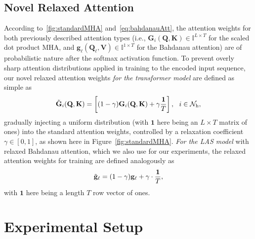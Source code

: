 \documentclass{article}
\newcommand{\VEC}[1]{\mathbf{#1}}          \newcommand{\VECG}[1]{\boldmath{#1}}     \newcommand{\MAT}[1]{\mathbf{#1}}          \newcommand{\MATG}[1]{\boldsymbol{#1}}
\begin{document}
\subsection{Novel Relaxed Attention}\vspace{-2mm}
According to~\eqref{fig:standardMHA} and~\eqref{eq:bahdanauAtt}, the attention weights for both previously described attention types (i.e., $\MAT{G}_i(\MAT{Q},\MAT{K})\!\in\!\mathbb{I}^{L\times T}$ for the scaled dot product MHA, and $	\VEC{g}_\ell(\MAT{Q}_\ell,\MAT{V})\!\in\!\mathbb{I}^{1\times T}$ for the Bahdanau attention) are of probabilistic nature after the softmax activation function. To prevent overly sharp attention distributions applied in training to the encoded input sequence, our novel relaxed attention weights \textit{for the transformer model} are defined as simple as
\begin{equation}\label{eq:relaxAttn}\vspace{-2mm}
	\tilde{\MAT{G}}_i(\MAT{Q},\MAT{K})=\left[(1-\gamma)\MAT{G}_i(\MAT{Q},\MAT{K}) + \gamma\frac{\VEC{1}}{T}\right],\ \ i\in\mathcal{N}_\mathrm{h},
\end{equation}
 gradually injecting a uniform distribution (with $\VEC{1}$ here being an $L\!\times\! T$ matrix of ones) into the standard attention weights, controlled by a relaxation coefficient $\gamma\in[0,1]$, as shown here in Figure~\ref{fig:standardMHA}. \textit{For the LAS model} with relaxed Bahdanau attention, which we also use for our experiments, the relaxed attention weights for training are defined analogously as 
\vspace{-1mm}\begin{equation}\label{eq:relaxAttn_LAS}\vspace{-1mm}
 \tilde{\VEC{g}}_\ell=(1-\gamma)\VEC{g}_\ell + \gamma\cdot\frac{\VEC{1}}{T},
\end{equation}
with $\VEC{1}$ here being a length $T$ row vector of ones.


\vspace{-1mm}

\section{Experimental Setup}\vspace{-3mm}
\end{document}
